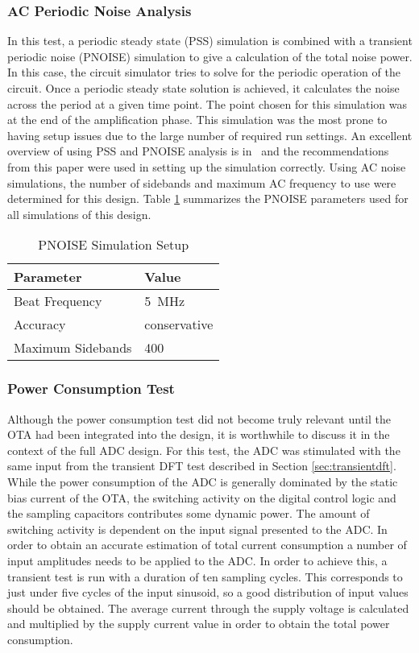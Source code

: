 \subsubsection{AC Periodic Noise Analysis}
In this test, a periodic steady state (PSS) simulation is combined with a transient periodic noise (PNOISE) simulation to give a calculation of the total noise power. In this case, the circuit simulator tries to solve for the periodic operation of the circuit. Once a periodic steady state solution is achieved, it calculates the noise across the period at a given time point. The point chosen for this simulation was at the end of the amplification phase. This simulation was the most prone to having setup issues due to the large number of required run settings. An excellent overview of using PSS and PNOISE analysis is in~\cite{simswitchcap} and the recommendations from this paper were used in setting up the simulation correctly. Using AC noise simulations, the number of sidebands and maximum AC frequency to use were determined for this design. Table \ref{tab:pnoiseparams} summarizes the PNOISE parameters used for all simulations of this design.
\begin{table}[htbp]
\begin{center}
\begin{tabular}{|l|l|}
\hline
Parameter & Value \\ \hline
Beat Frequency & \SI{5}{\mega\hertz} \\ \hline
Accuracy & conservative \\ \hline
Maximum Sidebands & 400 \\ \hline
\end{tabular}
\caption{PNOISE Simulation Setup}
\label{tab:pnoiseparams}
\end{center}
\end{table}
\subsubsection{Power Consumption Test}
\label{sec:powerconsumptiontest}
Although the power consumption test did not become truly relevant until the OTA had been integrated into the design, it is worthwhile to discuss it in the context of the full ADC design. For this test, the ADC was stimulated with the same input from the transient DFT test described in Section \ref{sec:transientdft}. While the power consumption of the ADC is generally dominated by the static bias current of the OTA, the switching activity on the digital control logic and the sampling capacitors contributes some dynamic power. The amount of switching activity is dependent on the input signal presented to the ADC. In order to obtain an accurate estimation of total current consumption a number of input amplitudes needs to be applied to the ADC. In order to achieve this, a transient test is run with a duration of ten sampling cycles. This corresponds to just under five cycles of the input sinusoid, so a good distribution of input values should be obtained. The average current through the supply voltage is calculated and multiplied by the supply current value in order to obtain the total power consumption.
